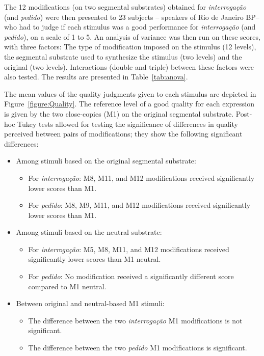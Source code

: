 \documentclass[output=paper]{LSP/langsci}
\begin{document}
The 12 modifications (on two segmental substrates) obtained for \textit{interrogação} (and \textit{pedido}) were then presented to 23 subjects -- speakers of Rio de Janeiro BP--who had to judge if each stimulus was a good performance for \textit{interrogação} (and \textit{pedido}), on a scale of 1 to 5. 
An analysis of variance was then run on these scores, with three factors: The type of modification imposed on the stimulus (12 levels), the segmental substrate used to synthesize the stimulus (two levels) and the original  (two levels). 
Interactions (double and triple) between these factors were also tested. 
The results are presented in Table~\ref{tab:anova}.



The mean values of the quality judgments given to each stimulus are depicted in Figure~\ref{figure:Quality}. 
The reference level of a good quality for each expression is given by the two close-copies (M1) on the original segmental substrate. 
Post-hoc Tukey tests allowed for testing the significance of differences in quality perceived between pairs of modifications; they show the following significant differences:
\begin{itemize}
\item Among stimuli based on the original segmental substrate:
\begin{itemize}
\item For \textit{interrogação}: M8, M11, and M12 modifications received significantly lower scores than M1.
\item For \textit{pedido}: M8, M9, M11, and M12 modifications received significantly lower scores than M1.
\end{itemize}
\item Among stimuli based on the neutral substrate:
\begin{itemize}
\item For \textit{interrogação}: M5, M8, M11, and M12 modifications received significantly lower scores than M1 neutral.
\item For \textit{pedido}: No modification received a significantly different score compared to M1 neutral.
\end{itemize}
\item Between original and neutral-based M1 stimuli:
\begin{itemize}
\item The difference between the two \textit{interrogação} M1 modifications is not significant.
\item The difference between the two \textit{pedido} M1 modifications is significant.
\end{itemize}
\end{itemize}
\end{document}
